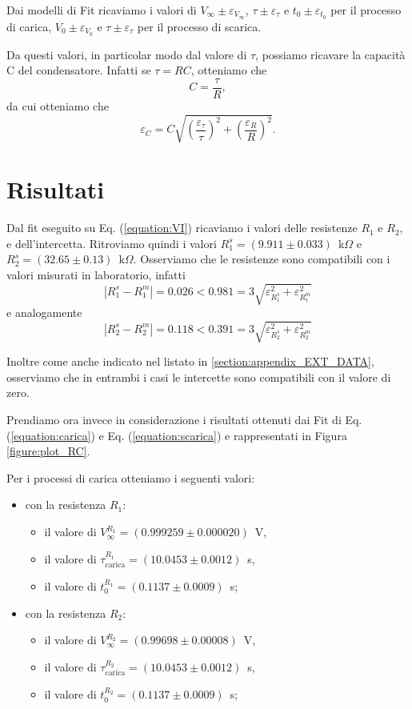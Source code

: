 \documentclass[italian, a4paper, 10pt, twocolumn]{../../style/lab_unige}
\newcommand{\reffig}[1]{Figura {\ref{#1}}}%
\newcommand{\refeqn}[1]{Eq. ({\ref{#1}})}%
\newcommand{\mstdErr}[1]{\varepsilon_{#1}}
\begin{document}
    Dai modelli di Fit ricaviamo i valori di $V_\infty\pm\mstdErr{V_\infty}$, $\tau\pm\mstdErr{\tau}$ e $t_0\pm\mstdErr{t_0}$ per il processo di carica, $V_0\pm\mstdErr{V_0}$ e $\tau\pm\mstdErr{\tau}$ per il processo di scarica.

    Da questi valori, in particolar modo dal valore di $\tau$, possiamo ricavare la capacità C del condensatore. Infatti se $\tau=RC$, otteniamo che \[C=\frac{\tau}{R},\] da cui otteniamo che \[\mstdErr{C}=C\sqrt{\left(\frac{\mstdErr{\tau}}{\tau}\right)^2+\left(\frac{\mstdErr{R}}{R}\right)^2}.\]

    \section{Risultati}
    \label{section:results}

    Dal fit eseguito su \refeqn{equation:VI} ricaviamo i valori delle resistenze $R_1$ e $R_2$, e dell'intercetta. Ritroviamo quindi i valori $R_1^s=(9.911\pm0.033)$~k$\Omega$ e $R_2^s=(32.65\pm0.13)$~k$\Omega$. Osserviamo che le resistenze sono compatibili con i valori misurati in laboratorio, infatti 
    \[\left|R_1^s-R_1^m\right|=0.026<0.981=3\sqrt{\mstdErr{R_1^s}^2+\mstdErr{R_1^m}^2}\]
    e analogamente
    \[\left|R_2^s-R_2^m\right|=0.118<0.391=3\sqrt{\mstdErr{R_2^s}^2+\mstdErr{R_2^m}^2}\]
    
    Inoltre come anche indicato nel listato in \autoref{section:appendix_EXT_DATA}, osserviamo che in entrambi i casi le intercette sono compatibili con il valore di zero.

    Prendiamo ora invece in considerazione i risultati ottenuti dai Fit di \refeqn{equation:carica} e \refeqn{equation:scarica} e rappresentati in \reffig{figure:plot_RC}. 

    Per i processi di carica otteniamo i seguenti valori:
    \begin{itemize}
        \item con la resistenza $R_1$:
        \begin{itemize}
            \item il valore di $V_\infty^{R_1}=(0.999259\pm0.000020)$~V, 
            \item il valore di $\tau^{R_1}_{\text{carica}}=(10.0453\pm0.0012)$~s, 
            \item il valore di $t_0^{R_1}=(0.1137\pm0.0009)$~s;
        \end{itemize}
        \item con la resistenza $R_2$:
        \begin{itemize}
            \item il valore di $V_\infty^{R_2}=(0.99698\pm0.00008)$~V,
            \item il valore di $\tau^{R_2}_{\text{carica}}=(10.0453\pm0.0012)$~s,
            \item il valore di $t_0^{R_2}=(0.1137\pm0.0009)$~s;
        \end{itemize}
    \end{itemize}
    
\end{document}
